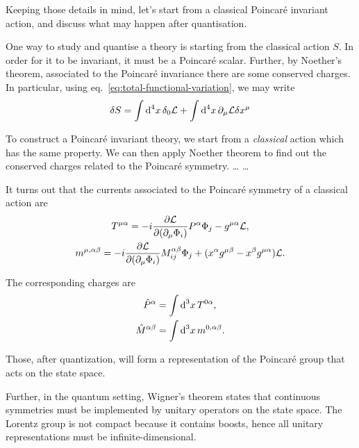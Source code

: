 Keeping those details in mind, let's start from a classical Poincaré invariant action, and discuss what may happen after quantisation.



One way to study and quantise a theory is starting from the classical action $S$. In order for it to be invariant, it must be a Poincaré scalar. Further, by Noether's theorem, associated to the Poincaré invariance there are some conserved charges. In particular, using eq.~\eqref{eq:total-functional-variation}, we may write
\begin{equation}
    \delta S = \int {\mathop{}\!\mathrm{d}}^4 x \, \delta_0 \mathcal{L} + \int {\mathop{}\!\mathrm{d}}^4 x \, \partial_\mu \mathcal{L} \delta x^\mu
\end{equation}



To construct a Poincaré invariant theory, we start from a \emph{classical} action which has the same property. We can then apply Noether theorem to find out the conserved charges related to the Poincaré symmetry. 
\dots
\dots

It turns out that the currents associated to the Poincaré symmetry of a classical action are
\begin{subequations}
\begin{gather}
T^{\mu\alpha} = -i \frac{\partial \mathcal{L}}{\partial(\partial_\mu \Phi_i)} P^\alpha \Phi_j - g^{\mu\alpha} \mathcal{L} , \\
m^{\mu,\alpha\beta} = -i \frac{\partial \mathcal{L}}{\partial (\partial_\mu \Phi_i)} M^{\alpha\beta}_{ij} \Phi_j + (x^\alpha g^{\mu\beta} - x^\beta g^{\mu\alpha}) \mathcal{L} .
\end{gather}
\end{subequations}

The corresponding charges are
\begin{subequations}\label{eq:const-motion}
\begin{align}
    \hat{P}^\alpha &= \int {\mathop{}\!\mathrm{d}}^3 x \, T^{0\alpha} , \\
   \hat{M}^{\alpha\beta} &= \int {\mathop{}\!\mathrm{d}}^3 x \, m^{0 ,\alpha\beta} .
\end{align}
\end{subequations}

Those, after quantization, will form a representation of the Poincaré group that acts on the state space.

Further, in the quantum setting, Wigner's theorem states that continuous symmetries must be implemented by unitary operators on the state space. The Lorentz group is not compact because it contains boosts, hence all unitary representations must be infinite-dimensional. 


